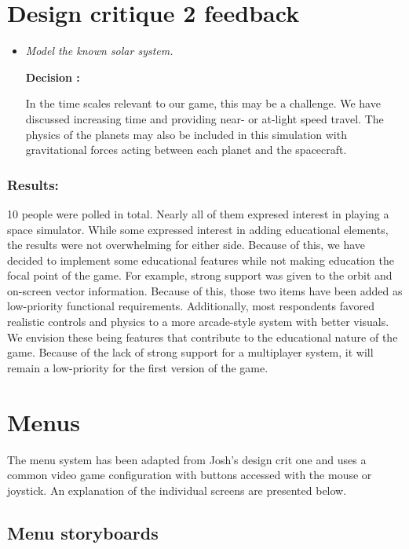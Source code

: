 \section*{Design critique 2 feedback}

\begin{itemize}

  \item \emph{Model the known solar system.}
        
        \textbf{Decision : } \parbox[t]{5in}{In the time scales relevant to our game, this may be a challenge.  We have discussed increasing time and providing near- or at-light speed travel.  The physics of the planets may also be included in this simulation with gravitational forces acting between each planet and the spacecraft.}

\end{itemize}

\subsubsection*{Results:}

  \parbox[t]{6.5in}{10 people were polled in total. Nearly all of them expresed interest in playing a space simulator. While some expressed interest in adding educational elements, the results were not overwhelming for either side. Because of this, we have decided to implement some educational features while not making education the focal point of the game. For example, strong support was given to the orbit and on-screen vector information. Because of this, those two items have been added as low-priority functional requirements. Additionally, most respondents favored realistic controls and physics to a more arcade-style system with better visuals. We envision these being features that contribute to the educational nature of the game. Because of the lack of strong support for a multiplayer system, it will remain a low-priority for the first version of the game.}

\section*{Menus}

The menu system has been adapted from Josh's design crit one and uses a common video game configuration with buttons accessed with the mouse or joystick.  An explanation of the individual screens are presented below.

\subsection*{Menu storyboards}

